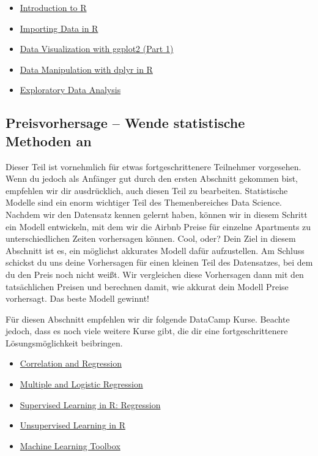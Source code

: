 \documentclass[
]{book}
\begin{document}
\begin{itemize}
\item \href{https://www.datacamp.com/courses/free-introduction-to-r}{Introduction to R}
\item \href{https://www.datacamp.com/courses/importing-data-in-r-part-1}{Importing Data in R}
\item \href{https://www.datacamp.com/courses/data-visualization-with-ggplot2-1}{Data Visualization with ggplot2 (Part 1)}
\item \href{https://www.datacamp.com/courses/data-manipulation-with-dplyr-in-r}{Data Manipulation with dplyr in R}
\item \href{https://www.datacamp.com/courses/exploratory-data-analysis}{Exploratory Data Analysis}
\end{itemize}

\hypertarget{preisvorhersage-wende-statistische-methoden-an}{%
\subsection{Preisvorhersage -- Wende statistische Methoden an}\label{preisvorhersage-wende-statistische-methoden-an}}

Dieser Teil ist vornehmlich für etwas fortgeschrittenere Teilnehmer vorgesehen.
Wenn du jedoch als Anfänger gut durch den ersten Abschnitt gekommen bist, empfehlen wir dir ausdrücklich, auch diesen Teil zu bearbeiten.
Statistische Modelle sind ein enorm wichtiger Teil des Themenbereiches Data Science.\\
Nachdem wir den Datensatz kennen gelernt haben, können wir in diesem Schritt ein Modell entwickeln, mit dem wir die Airbnb Preise für einzelne Apartments zu unterschiedlichen Zeiten vorhersagen können.
Cool, oder?
Dein Ziel in diesem Abschnitt ist es, ein möglichst akkurates Modell dafür aufzustellen.
Am Schluss schickst du uns deine Vorhersagen für einen kleinen Teil des Datensatzes, bei dem du den Preis noch nicht weißt.
Wir vergleichen diese Vorhersagen dann mit den tatsächlichen Preisen und berechnen damit, wie akkurat dein Modell Preise vorhersagt.
Das beste Modell gewinnt!

Für diesen Abschnitt empfehlen wir dir folgende DataCamp Kurse. Beachte jedoch, dass es noch viele weitere Kurse gibt, die dir eine fortgeschrittenere Lösungsmöglichkeit beibringen.

\begin{itemize}
\item \href{https://www.datacamp.com/courses/correlation-and-regression}{Correlation and Regression}
\item \href{https://www.datacamp.com/courses/multiple-and-logistic-regression}{Multiple and Logistic Regression}
\item \href{https://www.datacamp.com/courses/supervised-learning-in-r-regression}{Supervised Learning in R: Regression}
\item \href{https://www.datacamp.com/courses/unsupervised-learning-in-r}{Unsupervised Learning in R}
\item \href{https://www.datacamp.com/courses/machine-learning-toolbox}{Machine Learning Toolbox}
\end{itemize}
\end{document}
